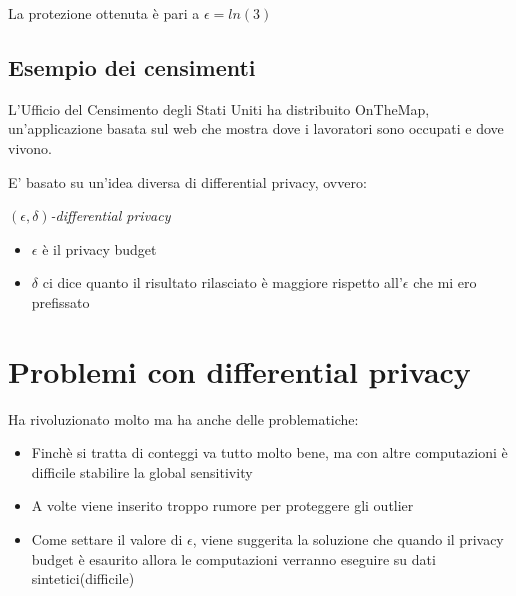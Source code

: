 \documentclass{report}
\begin{document}
\noindent La protezione ottenuta è pari a $\epsilon = ln(3)$

\section{Esempio dei censimenti}
L'Ufficio del Censimento degli Stati Uniti ha distribuito OnTheMap, un'applicazione basata sul web che mostra dove i lavoratori sono occupati e dove vivono.

\noindent E' basato su un'idea diversa di differential privacy, ovvero:
\begin{center}
    \textit{$(\epsilon, \delta)$-differential privacy}
\end{center}

\begin{itemize}
    \item $\epsilon$ è il privacy budget
    \item $\delta$ ci dice quanto il risultato rilasciato è maggiore rispetto all'$\epsilon$ che mi ero prefissato
\end{itemize}

\chapter{Problemi con differential privacy}
Ha rivoluzionato molto ma ha anche delle problematiche:
\begin{itemize}
    \item Finchè si tratta di conteggi va tutto molto bene, ma con altre computazioni è difficile stabilire la global sensitivity
    \item A volte viene inserito troppo rumore per proteggere gli outlier 
    \item Come settare il valore di $\epsilon$, viene suggerita la soluzione che quando il privacy budget è esaurito allora le computazioni verranno eseguire su dati sintetici(difficile)
\end{itemize}
\end{document}
